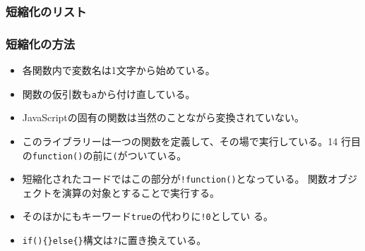 \begin{frame}[containsverbatim]
\frametitle{短縮化のリスト}
\end{frame}
\begin{frame}[containsverbatim]
\frametitle{短縮化の方法}
\begin{itemize}
 \item 各関数内で変数名は1文字から始めている。
 \item 関数の仮引数も\texttt{a}から付け直している。
 \item JavaScriptの固有の関数は当然のことながら変換されていない。
 \item このライブラリーは一つの関数を定義して、その場で実行している。14
       行目の\texttt{function()}の前に\texttt{(}がついている。
 \item 短縮化されたコードではこの部分が\texttt{!function()}となっている。
       関数オブジェクトを演算の対象とすることで実行する。
 \item そのほかにもキーワード\texttt{true}の代わりに\texttt{!0}としてい
       る。
 \item \texttt{if()\{\}else\{\}}構文は\texttt{?}に置き換えている。
\end{itemize}
\end{frame}
